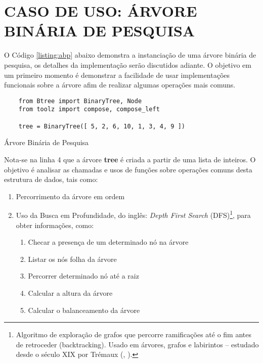 \section{CASO DE USO: ÁRVORE BINÁRIA DE PESQUISA}

O Código \ref{listing:abp} abaixo demonstra a instanciação de uma árvore binária de pesquisa, os detalhes da implementação
serão discutidos adiante. O objetivo em um primeiro momento é demonstrar a facilidade de usar implementações funcionais
sobre a árvore afim de realizar algumas operações mais comuns.

\begin{listing}[H]
    \begin{verbatim}
    from Btree import BinaryTree, Node
    from toolz import compose, compose_left
    
    tree = BinaryTree([ 5, 2, 6, 10, 1, 3, 4, 9 ])
    \end{verbatim}
    \caption{Árvore Binária de Pesquisa}
    \label{listing:abp}
\end{listing}

Nota-se na linha 4 que a árvore \textbf{tree} é criada a partir de uma lista de inteiros. O objetivo
é analisar as chamadas e usos de funções sobre operações comuns desta estrutura de dados, tais como:

\begin{enumerate}
    \item Percorrimento da árvore em ordem
    \item Uso da Busca em Profundidade, do inglês: \textit{Depth First Search} (DFS)\footnote{
        Algoritmo de exploração de grafos que percorre ramificações até o fim antes de retroceder (backtracking). Usado em árvores, grafos e labirintos – estudado desde o século XIX por Trémaux (\citeauthor{wiki_dfs}, \citeyear{wiki_dfs})\cite{wiki_dfs}.
    }, para obter informações, como:
    \begin{enumerate}
        \item Checar a presença de um determinado nó na árvore
        \item Listar os nós folha da árvore
        \item Percorrer determinado nó até a raiz
        \item Calcular a altura da árvore
        \item Calcular o balanceamento da árvore
    \end{enumerate}
\end{enumerate}

